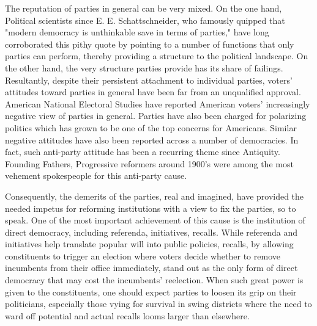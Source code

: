 \documentclass[crop=false]{standalone}
\begin{document}
	The reputation of parties in general can be very mixed. 
	On the one hand, 
	Political scientists since E. E. Schattschneider, 
	who famously quipped that
	"modern democracy is unthinkable save in terms of parties," have long corroborated this pithy quote by pointing to
	a number of functions that only parties can perform, thereby providing a structure to the political landscape.
	On the other hand, the very structure parties provide has its share of failings.
	Resultantly, despite their persistent attachment to individual parties, voters' attitudes toward parties in general have been far from an unqualified approval.
	American National Electoral Studies 
	have reported American voters' increasingly negative view of parties in general.
	Parties have also been charged for polarizing politics which has grown to be one of the top concerns for Americans.
	Similar negative attitudes have also been reported across a number of democracies.
	In fact, such anti-party attitude has been a recurring theme since Antiquity.
	Founding Fathers, Progressive reformers around 1900's were among the most vehement spokespeople 
	for this anti-party cause. 
	
	Consequently, the demerits of the parties, real and imagined, have provided the needed impetus for reforming institutions with a view to fix the parties, so to speak.
	One of the most important achievement of this cause is the institution of direct democracy, including referenda, initiatives, recalls. 
	While referenda and initiatives help translate popular will into public policies, recalls,
	by allowing constituents to trigger an election where voters decide whether to remove incumbents from their office immediately, 
	stand out as the only form of direct democracy that may cost the incumbents' reelection.
	When such great power is given to the constituents, one should expect parties to loosen its grip on their politicians, especially those vying for survival in swing districts where the need to ward off potential and actual recalls looms larger than elsewhere. 
	
\end{document}
